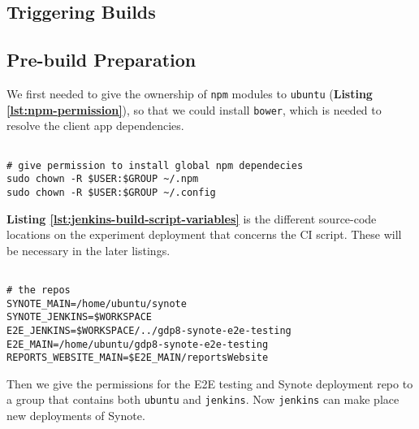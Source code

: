 \subsection{Triggering Builds}
\label{subsec:triggering-builds}

\subsection{Pre-build Preparation}
\label{subsec:pre-build-preparation}

We first needed to give the ownership of \texttt{npm} modules to \texttt{ubuntu} (\textbf{Listing \ref{lst:npm-permission}}), so that we could install \texttt{bower}, which is needed to resolve the client app dependencies.

\begin{listing}[H]
\begin{verbatim}

# give permission to install global npm dependecies
sudo chown -R $USER:$GROUP ~/.npm
sudo chown -R $USER:$GROUP ~/.config

\end{verbatim}
\label{lst:npm-permission}
\end{listing}

\textbf{Listing \ref{lst:jenkins-build-script-variables}} is the different source-code locations on the experiment deployment that concerns the CI script. These will be necessary in the later listings.

\begin{listing}[H]
\begin{verbatim}

# the repos
SYNOTE_MAIN=/home/ubuntu/synote
SYNOTE_JENKINS=$WORKSPACE
E2E_JENKINS=$WORKSPACE/../gdp8-synote-e2e-testing
E2E_MAIN=/home/ubuntu/gdp8-synote-e2e-testing
REPORTS_WEBSITE_MAIN=$E2E_MAIN/reportsWebsite

\end{verbatim}
\label{lst:jenkins-build-script-variables}
\end{listing}

Then we give the permissions for the E2E testing and Synote deployment repo to a group that contains both \texttt{ubuntu} and \texttt{jenkins}. Now \texttt{jenkins} can make place new deployments of Synote.

